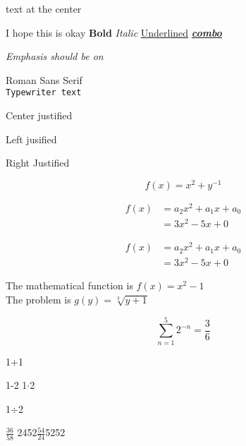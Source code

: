 \documentclass[10pt]{article}
\begin{document}
	\begin{center}
		{\Huge text at the center}
	\end{center}
	
	I hope this is okay
	\textbf{Bold}
	\textit{Italic}
	\underline{Underlined}
	\textbf{\textit{\underline{combo}}}
	
	
	\emph{Emphasis should be on}
	
	
	\textrm{Roman}
	\textsf{Sans Serif} \\
	\texttt{Typewriter text}
	
	\begin{center}
		Center justified
	\end{center}
	\begin{flushleft}
		Left jusified
	\end{flushleft}
	\begin{flushright}
		Right Justified
	\end{flushright}

	
	
	
	\[ f(x) = x^2+y^{-1}\]
	
	\begin{align*}
		f(x) &= a_2 x^2 + a_1 x +a_0 \\
			&= 3 x^2 -5 x + 0 
	\end{align*}

	\begin{align}
		f(x) &= a_2 x^2 + a_1 x +a_0 
		\nonumber \\
		&= 3 x^2 -5 x + 0 
	\end{align}

	The mathematical function is 
	\(f(x)= x^2 -1\) \\
	The problem is
	$g(y)= \sqrt[3]{y+1}$
	
	\[ 
		\sum_{n=1}^{5} 2^{-n} = \frac{3}{6}
	\]
	
	
	
	1+1 
	
	1-2
	1$\cdot$2 
	
	1$\div$2 
	
	$\frac{36}{58}$
	2452$\tfrac{54}{24}$5252 \\
	
\end{document}
